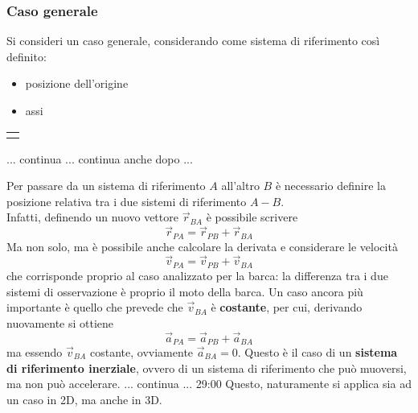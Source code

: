 \documentclass[a4paper]{extarticle}
\begin{document}
\subsubsection{Caso generale}
Si consideri un caso generale, considerando come sistema di riferimento così definito:
\begin{itemize}
  \item posizione dell'origine
  \item assi
\end{itemize}
\vspace{2em}
\noindent
{}
\begin{tabularx}{\textwidth}{P}
  {
      \centering
  }
\end{tabularx}

... continua ... continua anche dopo ...

\vspace{1em}
\noindent
Per passare da un sistema di riferimento $A$ all'altro $B$ è necessario definire la posizione relativa tra i due sistemi di riferimento $A-B$.\\
Infatti, definendo un nuovo vettore $\vec{r}_{BA}$ è possibile scrivere
\[\vec{r}_{PA} = \vec{r}_{PB} + \vec{r}_{BA}\]
Ma non solo, ma è possibile anche calcolare la derivata e considerare le velocità
\[\vec{v}_{PA} = \vec{v}_{PB} + \vec{v}_{BA}\]
che corrisponde proprio al caso analizzato per la barca: la differenza tra i due sistemi di osservazione è proprio il moto della barca. Un caso ancora più importante è quello che prevede che $\vec{v}_{BA}$ è \textbf{costante}, per cui, derivando nuovamente si ottiene
\[\vec{a}_{PA} = \vec{a}_{PB} + \vec{a}_{BA}\]
ma essendo $\vec{v}_{BA}$ costante, ovviamente $\vec{a}_{BA} = 0$. Questo è il caso di un \textbf{sistema di riferimento inerziale}, ovvero di un sistema di riferimento che può muoversi, ma non può accelerare.
... continua ... 29:00
Questo, naturamente si applica sia ad un caso in 2D, ma anche in 3D.
\end{document}
